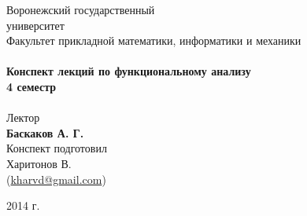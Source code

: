 \begin{titlepage}
\begin{center}

{\LARGE Воронежский государственный\\[0.2cm]университет}\\[0.5cm]
{\large Факультет прикладной математики, информатики и механики}\\[1.5cm]

\HRule \\[0.4cm]
{ \huge \bfseries Конспект лекций по функциональному анализу \\[0.4cm] }
{ \Large \bfseries 4 семестр \\[0.4cm]}
\HRule \\[3cm]

{\large Лектор}\\[0.2cm]
{\Large \bfseries Баскаков А. Г.}\\[2cm]

{Конспект подготовил}\\[0.2cm]
{Харитонов В. \\ (\href{mailto:kharvd@gmail.com}{kharvd@gmail.com})}
\vfill

{\large 2014 г.}

\end{center}
\end{titlepage}
